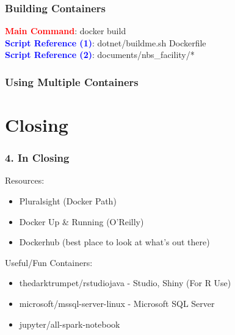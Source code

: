 \documentclass{beamer}
\begin{document}
\begin{frame}
    \frametitle{Building Containers}
    \textcolor{red}{\textbf{Main Command}}: docker build \\
    \textcolor{blue}{\textbf{Script Reference (1)}}: dotnet/buildme.sh Dockerfile \\
    \textcolor{blue}{\textbf{Script Reference (2)}}: documents/nbs\_facility/*
\end{frame}

\begin{frame}
    \frametitle{Using Multiple Containers}
\end{frame}

\section{Closing}
\begin{frame}
    \frametitle{4. In Closing}
    Resources:
    \begin{itemize}
        \item Pluralsight (Docker Path)
        \item Docker Up \& Running (O'Reilly)
        \item Dockerhub (best place to look at what's out there)
    \end{itemize}
    Useful/Fun Containers:
    \begin{itemize}
        \item thedarktrumpet/rstudiojava - Studio, Shiny (For R Use)
        \item microsoft/mssql-server-linux - Microsoft SQL Server
        \item jupyter/all-spark-notebook
    \end{itemize}
\end{frame}
\end{document}

